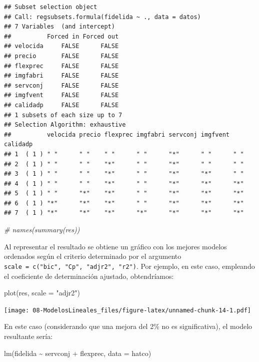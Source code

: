 \documentclass[
]{book}
\newenvironment{Shaded}{\begin{snugshade}}{\end{snugshade}}
\newcommand{\AttributeTok}[1]{\textcolor[rgb]{0.77,0.63,0.00}{#1}}
\newcommand{\CommentTok}[1]{\textcolor[rgb]{0.56,0.35,0.01}{\textit{#1}}}
\newcommand{\FunctionTok}[1]{\textcolor[rgb]{0.00,0.00,0.00}{#1}}
\newcommand{\NormalTok}[1]{#1}
\newcommand{\SpecialCharTok}[1]{\textcolor[rgb]{0.00,0.00,0.00}{#1}}
\newcommand{\StringTok}[1]{\textcolor[rgb]{0.31,0.60,0.02}{#1}}
\theoremstyle{break}
\begin{document}
\begin{verbatim}
## Subset selection object
## Call: regsubsets.formula(fidelida ~ ., data = datos)
## 7 Variables  (and intercept)
##          Forced in Forced out
## velocida     FALSE      FALSE
## precio       FALSE      FALSE
## flexprec     FALSE      FALSE
## imgfabri     FALSE      FALSE
## servconj     FALSE      FALSE
## imgfvent     FALSE      FALSE
## calidadp     FALSE      FALSE
## 1 subsets of each size up to 7
## Selection Algorithm: exhaustive
##          velocida precio flexprec imgfabri servconj imgfvent calidadp
## 1  ( 1 ) " "      " "    " "      " "      "*"      " "      " "     
## 2  ( 1 ) " "      " "    "*"      " "      "*"      " "      " "     
## 3  ( 1 ) " "      " "    "*"      " "      "*"      "*"      " "     
## 4  ( 1 ) " "      " "    "*"      " "      "*"      "*"      "*"     
## 5  ( 1 ) " "      "*"    "*"      " "      "*"      "*"      "*"     
## 6  ( 1 ) "*"      "*"    "*"      " "      "*"      "*"      "*"     
## 7  ( 1 ) "*"      "*"    "*"      "*"      "*"      "*"      "*"
\end{verbatim}

\begin{Shaded}
\begin{Highlighting}[]
\CommentTok{\# names(summary(res))}
\end{Highlighting}
\end{Shaded}

Al representar el resultado se obtiene un gráfico con los mejores modelos ordenados
según el criterio determinado por el argumento \texttt{scale\ =\ c("bic",\ "Cp",\ "adjr2",\ "r2")}.
Por ejemplo, en este caso, empleando el coeficiente de determinación ajustado, obtendríamos:

\begin{Shaded}
\begin{Highlighting}[]
\FunctionTok{plot}\NormalTok{(res, }\AttributeTok{scale =} \StringTok{"adjr2"}\NormalTok{)}
\end{Highlighting}
\end{Shaded}

\texttt{[image: 08-ModelosLineales\_files/figure-latex/unnamed-chunk-14-1.pdf]}

En este caso (considerando que una mejora del 2\% no es significativa), el modelo resultante sería:

\begin{Shaded}
\begin{Highlighting}[]
\FunctionTok{lm}\NormalTok{(fidelida }\SpecialCharTok{\textasciitilde{}}\NormalTok{ servconj }\SpecialCharTok{+}\NormalTok{ flexprec, }\AttributeTok{data =}\NormalTok{ hatco)}
\end{Highlighting}
\end{Shaded}
\end{document}
